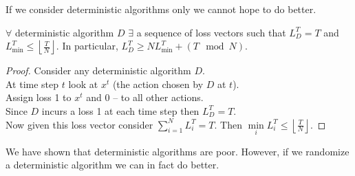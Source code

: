 If we consider deterministic algorithms only we cannot hope to do better.
\begin{theorem}
$\forall$ deterministic algorithm $D$ $\exists$ a sequence of loss vectors such that $L^T_D=T$ and $L^T_{\min}\leqslant\left\lfloor\frac{T}{N}\right\rfloor$. In particular, $L^T_D\geqslant NL^T_{\min}+(T\mod N)$.
\end{theorem}
\begin{proof}
Consider any deterministic algorithm $D$.\\
At time step $t$ look at $x^t$ (the action chosen by $D$ at $t$).\\
Assign loss 1 to $x^t$ and 0 -- to all other actions.\\
Since $D$ incurs a loss 1 at each time step then $L^T_D=T$.\\
Now given this loss vector consider $\sum\limits_{i=1}^NL^T_i=T$. Then $\min\limits_i L^T_i\leqslant\left\lfloor\frac{T}{N}\right\rfloor$.
\end{proof}
We have shown that deterministic algorithms are poor. However, if we randomize a deterministic algorithm we can in fact do better.\\

